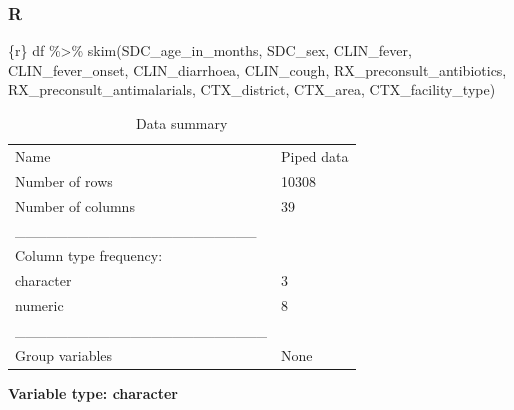 \documentclass[
  letterpaper,
  DIV=11,
  numbers=noendperiod,
  oneside]{scrreprt}
\newenvironment{Shaded}{\begin{snugshade}}{\end{snugshade}}
\newcommand{\FunctionTok}[1]{\textcolor[rgb]{0.28,0.35,0.67}{#1}}
\newcommand{\InformationTok}[1]{\textcolor[rgb]{0.37,0.37,0.37}{#1}}
\newcommand{\NormalTok}[1]{\textcolor[rgb]{0.00,0.23,0.31}{#1}}
\newcommand{\SpecialCharTok}[1]{\textcolor[rgb]{0.37,0.37,0.37}{#1}}
\begin{document}
\subsubsection{R}

\begin{Shaded}
\begin{Highlighting}[]
\InformationTok{\textasciigrave{}\textasciigrave{}\textasciigrave{}\{r\}}
\NormalTok{df }\SpecialCharTok{\%\textgreater{}\%}
  \FunctionTok{skim}\NormalTok{(SDC\_age\_in\_months,}
\NormalTok{       SDC\_sex,}
\NormalTok{       CLIN\_fever,}
\NormalTok{       CLIN\_fever\_onset,}
\NormalTok{       CLIN\_diarrhoea,}
\NormalTok{       CLIN\_cough,}
\NormalTok{       RX\_preconsult\_antibiotics,}
\NormalTok{       RX\_preconsult\_antimalarials,}
\NormalTok{       CTX\_district,}
\NormalTok{       CTX\_area,}
\NormalTok{       CTX\_facility\_type)}
\InformationTok{\textasciigrave{}\textasciigrave{}\textasciigrave{}}
\end{Highlighting}
\end{Shaded}

\begin{longtable}[]{@{}ll@{}}
\caption{Data summary}\tabularnewline
\toprule\noalign{}
\endfirsthead
\endhead
\bottomrule\noalign{}
\endlastfoot
Name & Piped data \\
Number of rows & 10308 \\
Number of columns & 39 \\
\_\_\_\_\_\_\_\_\_\_\_\_\_\_\_\_\_\_\_\_\_\_\_ & \\
Column type frequency: & \\
character & 3 \\
numeric & 8 \\
\_\_\_\_\_\_\_\_\_\_\_\_\_\_\_\_\_\_\_\_\_\_\_\_ & \\
Group variables & None \\
\end{longtable}

\textbf{Variable type: character}
\end{document}
